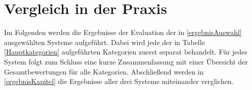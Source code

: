 \newpage
\chapter{Vergleich in der Praxis}
Im Folgenden werden die Ergebnisse der Evaluation der in \ref{ergebnisAuswahl} ausgewählten Systeme aufgeführt. Dabei wird jede der in Tabelle \ref{Hauptkategorien} aufgeführten Kategorien zuerst separat behandelt. Für jedes System folgt zum Schluss eine kurze Zusammenfassung mit einer Übersicht der Gesamtbewertungen für alle Kategorien. Abschließend werden in \ref{ergebnisKapitel} die Ergebnisse aller drei Systeme miteinander verglichen.



